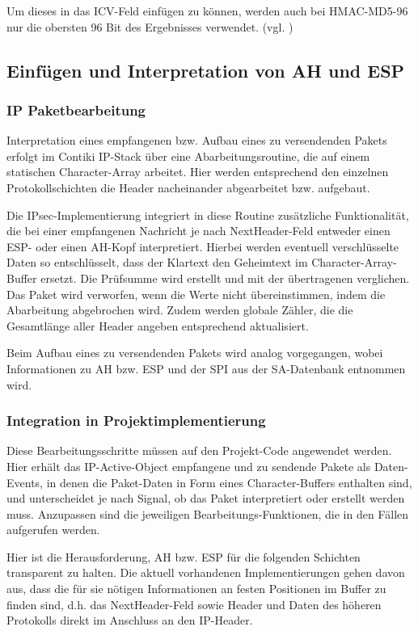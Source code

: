 Um dieses in das ICV-Feld einfügen zu können, werden auch bei HMAC-MD5-96 nur die obersten 96 Bit des Ergebnisses verwendet.
(vgl. \cite{RFC2104})

\subsection{Einfügen und Interpretation von AH und ESP}

\subsubsection{\textmu IP Paketbearbeitung}
Interpretation eines empfangenen bzw. Aufbau eines zu versendenden Pakets erfolgt im Contiki \textmu IP-Stack über eine Abarbeitungsroutine, die auf einem statischen Character-Array arbeitet.
Hier werden entsprechend den einzelnen Protokollschichten die Header nacheinander abgearbeitet bzw. aufgebaut. 

Die IPsec-Implementierung integriert in diese Routine zusätzliche Funktionalität, die bei einer empfangenen Nachricht je nach NextHeader-Feld entweder einen ESP- oder einen AH-Kopf interpretiert. Hierbei werden eventuell verschlüsselte Daten so entschlüsselt, dass der Klartext den Geheimtext im Character-Array-Buffer ersetzt. Die Prüfsumme wird erstellt und mit der übertragenen verglichen. Das Paket wird verworfen, wenn die Werte nicht übereinstimmen, indem die Abarbeitung abgebrochen wird. Zudem werden globale Zähler, die die Gesamtlänge aller Header angeben entsprechend aktualisiert.

Beim Aufbau eines zu versendenden Pakets wird analog vorgegangen, wobei Informationen zu AH bzw. ESP und der SPI aus der SA-Datenbank entnommen wird.

\subsubsection{Integration in Projektimplementierung}
Diese Bearbeitungsschritte müssen auf den Projekt-Code angewendet werden. Hier erhält das \textmu IP-Active-Object empfangene und zu sendende Pakete als Daten-Events, in denen die Paket-Daten in Form eines Character-Buffers enthalten sind, und unterscheidet je nach Signal, ob das Paket interpretiert oder erstellt werden muss. Anzupassen sind die jeweiligen Bearbeitungs-Funktionen, die in den Fällen aufgerufen werden.

Hier ist die Herausforderung, AH bzw. ESP für die folgenden Schichten transparent zu halten. Die aktuell vorhandenen Implementierungen gehen davon aus, dass die für sie nötigen Informationen an festen Positionen im Buffer zu finden sind, d.h. das NextHeader-Feld sowie Header und Daten des höheren Protokolls direkt im Anschluss an den IP-Header.

